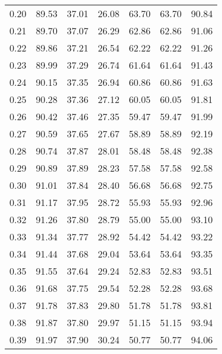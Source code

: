 \begin{tabular}{|c|c|c|c|c|c|c|}
      0.20 &     89.53 &     37.01 &      26.08 &   63.70 &      63.70 &         90.84 \\
      0.21 &     89.70 &     37.07 &      26.29 &   62.86 &      62.86 &         91.06 \\
      0.22 &     89.86 &     37.21 &      26.54 &   62.22 &      62.22 &         91.26 \\
      0.23 &     89.99 &     37.29 &      26.74 &   61.64 &      61.64 &         91.43 \\
      0.24 &     90.15 &     37.35 &      26.94 &   60.86 &      60.86 &         91.63 \\
      0.25 &     90.28 &     37.36 &      27.12 &   60.05 &      60.05 &         91.81 \\
      0.26 &     90.42 &     37.46 &      27.35 &   59.47 &      59.47 &         91.99 \\
      0.27 &     90.59 &     37.65 &      27.67 &   58.89 &      58.89 &         92.19 \\
      0.28 &     90.74 &     37.87 &      28.01 &   58.48 &      58.48 &         92.38 \\
      0.29 &     90.89 &     37.89 &      28.23 &   57.58 &      57.58 &         92.58 \\
      0.30 &     91.01 &     37.84 &      28.40 &   56.68 &      56.68 &         92.75 \\
      0.31 &     91.17 &     37.95 &      28.72 &   55.93 &      55.93 &         92.96 \\
      0.32 &     91.26 &     37.80 &      28.79 &   55.00 &      55.00 &         93.10 \\
      0.33 &     91.34 &     37.77 &      28.92 &   54.42 &      54.42 &         93.22 \\
      0.34 &     91.44 &     37.68 &      29.04 &   53.64 &      53.64 &         93.35 \\
      0.35 &     91.55 &     37.64 &      29.24 &   52.83 &      52.83 &         93.51 \\
      0.36 &     91.68 &     37.75 &      29.54 &   52.28 &      52.28 &         93.68 \\
      0.37 &     91.78 &     37.83 &      29.80 &   51.78 &      51.78 &         93.81 \\
      0.38 &     91.87 &     37.80 &      29.97 &   51.15 &      51.15 &         93.94 \\
      0.39 &     91.97 &     37.90 &      30.24 &   50.77 &      50.77 &         94.06 \\

\end{tabular}
